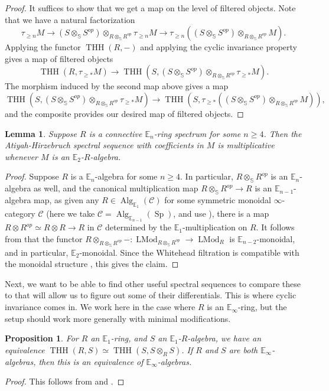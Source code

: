 \documentclass[11pt,leqno]{article}
\newcommand{\sss}{\mathbb{S}}
\newcommand{\bb}[1]{\mathbb{#1}}
\newcommand{\mc}[1]{\mathcal{#1}}
\DeclareMathOperator{\THH}{THH}
\DeclareMathOperator{\LMod}{LMod}
\newcommand{\mo}[1]{\operatorname{#1}}
\newtheorem*{short hand}{theorem name}
\theoremstyle{plain}  %
\newtheorem{proposition}{Proposition}[section]
\newtheorem{lemma}{Lemma}[section]
\theoremstyle{definition}
\numberwithin{equation}{section}
\begin{document}
\begin{proof}
It suffices to show that we get a map on the level of filtered objects.  Note that we have a natural factorization $$\tau_{\geq n}M \to (S\otimes_{\sss}S^{op}) \otimes_{R\otimes_{\sss}R^{op}} \tau_{\geq n}M\to \tau_{\geq n}( (S\otimes_{\sss}S^{op})\otimes_{R\otimes_{\sss}R^{op}} M).$$  Applying the functor $\THH(R,-)$ and applying the cyclic invariance property gives a map of filtered objects $$\THH(R,\tau_{\geq *}M)\to \THH(S,(S\otimes_{\sss}S^{op})\otimes_{R\otimes_{\sss}R^{op}}\tau_{\geq *}M).$$ The morphism induced by the second map above gives a map
$$\THH(S,(S\otimes_{\sss}S^{op})\otimes_{R\otimes_{\sss}R^{op}}\tau_{\geq *}M)\to \THH(S, \tau_{\geq*}((S\otimes_{\sss}S^{op})\otimes_{R\otimes_{\sss}R^{op}} M)),$$
and the composite provides our desired map of filtered objects.
\end{proof}

\begin{lemma}\label{lemma2.6}
	Suppose $R$ is a connective $\bb{E}_n$-ring spectrum for some $n\geq 4$.  Then the Atiyah-Hirzebruch spectral sequence with coefficients in $M$ is multiplicative whenever $M$ is an $\bb{E}_2$-$R$-algebra.
\end{lemma}  
\begin{proof}
Suppose $R$ is a $\bb{E}_n$-algebra for some $n\geq 4$.  In particular, $R\otimes_{\sss}R^{op}$ is an $\bb{E}_n$-algebra as well, and the canonical multiplication map $R\otimes_{\sss}R^{op}\to R$ is an $\bb{E}_{n-1}$-algebra map, as given any $R\in\mo{Alg}_{\bb{E}_1}(\mc{C})$ for some symmetric monoidal $\infty$-category $\mc{C}$ (here we take $\mc{C}=\mo{Alg}_{\bb{E}_{n-1}}(\mo{Sp})$, and use \cite[~Theorem 5.1.2.2]{HA}), there is a map $R\otimes R^{op}\simeq R\otimes R\to R$ in $\mc{C}$ determined by the $\bb{E}_1$-multiplication on $R$.  It follows from \cite[~Proposition 7.1.2.6]{HA} that the functor $R\otimes_{R\otimes_{\sss}R^{op}}-:\LMod_{R\otimes_{\sss}R^{op}}\to \LMod_R$ is $\bb{E}_{n-2}$-monoidal, and in particular, $\bb{E}_{2}$-monoidal.  Since the Whitehead filtration is compatible with the monoidal structure \cite[~Lemma 7.1.1.7]{HA}, this gives the claim. 
\end{proof}
Next, we want to be able to find other useful spectral sequences to compare these to that will allow us to figure out some of their differentials.  This is where cyclic invariance comes in.  We work here in the case where $R$ is an $\bb{E}_{\infty}$-ring, but the setup should work more generally with minimal modifications.
\begin{proposition}\label{proposition2.7}
	For $R$ an $\bb{E}_{1}$-ring, and $S$ an $\bb{E}_1$-$R$-algebra, we have an equivalence $\THH(R,S)\simeq \THH(S, S\otimes_{R}S)$.  If $R$ and $S$ are both $\bb{E}_{\infty}$-algebras, then this is an equivalence of $\bb{E}_\infty$-algebras.
\end{proposition}
\begin{proof}
This follows from \cite[~Proposition 6.2]{Blumberg_2012} and \cite[~Lemma 4.8, Remark 4.10]{H2020}.
\end{proof}
\end{document}
